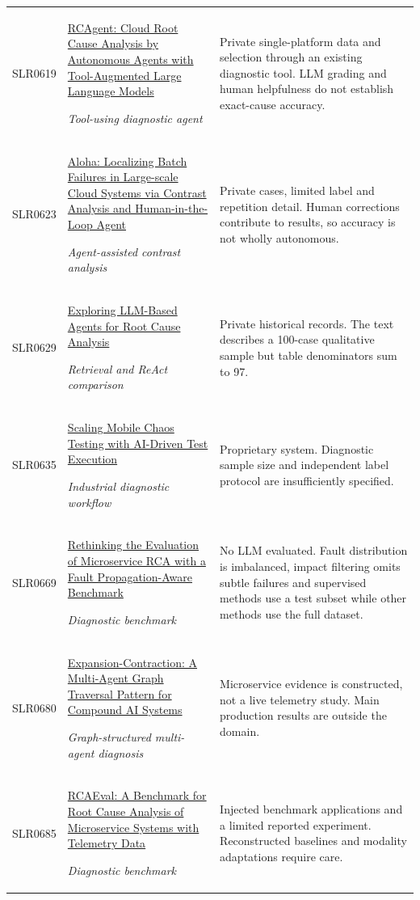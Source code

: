 \begin{longtable}{@{}p{}p{}p{}@{}}
SLR0619 & \href{https://arxiv.org/pdf/2310.16340}{RCAgent: Cloud Root Cause Analysis by Autonomous Agents with Tool-Augmented Large Language Models}\par\emph{Tool-using diagnostic agent} & Private single-platform data and selection through an existing diagnostic tool. LLM grading and human helpfulness do not establish exact-cause accuracy. \\
SLR0623 & \href{https://nkcs.iops.ai/wp-content/uploads/2026/04/Yujia__Aloha_to_FSE_26.pdf}{Aloha: Localizing Batch Failures in Large-scale Cloud Systems via Contrast Analysis and Human-in-the-Loop Agent}\par\emph{Agent-assisted contrast analysis} & Private cases, limited label and repetition detail. Human corrections contribute to results, so accuracy is not wholly autonomous. \\
SLR0629 & \href{https://arxiv.org/pdf/2403.04123}{Exploring LLM-Based Agents for Root Cause Analysis}\par\emph{Retrieval and ReAct comparison} & Private historical records. The text describes a 100-case qualitative sample but table denominators sum to 97. \\
SLR0635 & \href{https://arxiv.org/pdf/2602.06223}{Scaling Mobile Chaos Testing with AI-Driven Test Execution}\par\emph{Industrial diagnostic workflow} & Proprietary system. Diagnostic sample size and independent label protocol are insufficiently specified. \\
SLR0669 & \href{https://arxiv.org/pdf/2510.04711}{Rethinking the Evaluation of Microservice RCA with a Fault Propagation-Aware Benchmark}\par\emph{Diagnostic benchmark} & No LLM evaluated. Fault distribution is imbalanced, impact filtering omits subtle failures and supervised methods use a test subset while other methods use the full dataset. \\
SLR0680 & \href{https://cdn.amazon.science/9d/ff/bc236d704789bdfcfe521bd55614/scipub-approval152129-45181258-expansioncontraction-a-multiagent-graph-traversal-pattern-for-compound-ai-systems.pdf}{Expansion-Contraction: A Multi-Agent Graph Traversal Pattern for Compound AI Systems}\par\emph{Graph-structured multi-agent diagnosis} & Microservice evidence is constructed, not a live telemetry study. Main production results are outside the domain. \\
SLR0685 & \href{https://arxiv.org/pdf/2412.17015}{RCAEval: A Benchmark for Root Cause Analysis of Microservice Systems with Telemetry Data}\par\emph{Diagnostic benchmark} & Injected benchmark applications and a limited reported experiment. Reconstructed baselines and modality adaptations require care. \\

\end{longtable}
